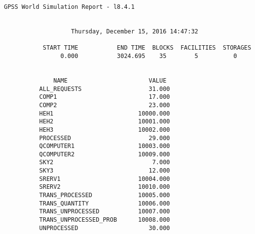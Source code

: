 \begin{lstlisting}[caption={отчет}]
              GPSS World Simulation Report - l8.4.1


                   Thursday, December 15, 2016 14:47:32  

           START TIME           END TIME  BLOCKS  FACILITIES  STORAGES
                0.000           3024.695    35        5          0


              NAME                       VALUE  
          ALL_REQUESTS                   31.000
          COMP1                          17.000
          COMP2                          23.000
          HEH1                        10000.000
          HEH2                        10001.000
          HEH3                        10002.000
          PROCESSED                      29.000
          QCOMPUTER1                  10003.000
          QCOMPUTER2                  10009.000
          SKY2                            7.000
          SKY3                           12.000
          SRERV1                      10004.000
          SRERV2                      10010.000
          TRANS_PROCESSED             10005.000
          TRANS_QUANTITY              10006.000
          TRANS_UNPROCESSED           10007.000
          TRANS_UNPROCESSED_PROB      10008.000
          UNPROCESSED                    30.000



\end{lstlisting}
